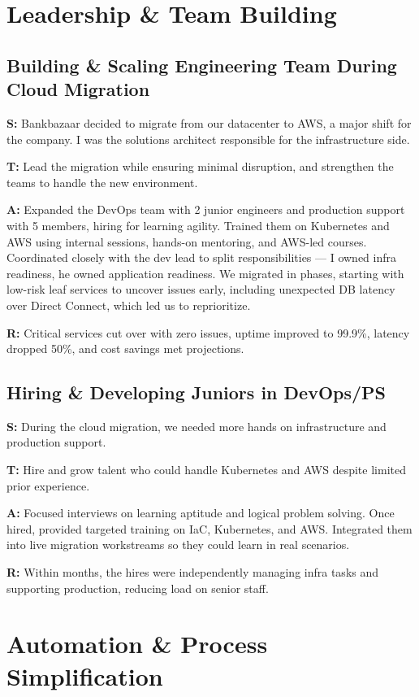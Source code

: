 \documentclass[11pt]{article}
\begin{document}
\section{Leadership \& Team Building}

\subsection{Building \& Scaling Engineering Team During Cloud Migration}
\textbf{S:} Bankbazaar decided to migrate from our datacenter to AWS, a major shift for the company. I was the solutions architect responsible for the infrastructure side.

\textbf{T:} Lead the migration while ensuring minimal disruption, and strengthen the teams to handle the new environment.

\textbf{A:} Expanded the DevOps team with 2 junior engineers and production support with 5 members, hiring for learning agility. Trained them on Kubernetes and AWS using internal sessions, hands-on mentoring, and AWS-led courses. Coordinated closely with the dev lead to split responsibilities — I owned infra readiness, he owned application readiness. We migrated in phases, starting with low-risk leaf services to uncover issues early, including unexpected DB latency over Direct Connect, which led us to reprioritize.

\textbf{R:} Critical services cut over with zero issues, uptime improved to 99.9\%, latency dropped 50\%, and cost savings met projections.

\subsection{Hiring \& Developing Juniors in DevOps/PS}
\textbf{S:} During the cloud migration, we needed more hands on infrastructure and production support.

\textbf{T:} Hire and grow talent who could handle Kubernetes and AWS despite limited prior experience.

\textbf{A:} Focused interviews on learning aptitude and logical problem solving. Once hired, provided targeted training on IaC, Kubernetes, and AWS. Integrated them into live migration workstreams so they could learn in real scenarios.

\textbf{R:} Within months, the hires were independently managing infra tasks and supporting production, reducing load on senior staff.

\section{Automation \& Process Simplification}
\end{document}
